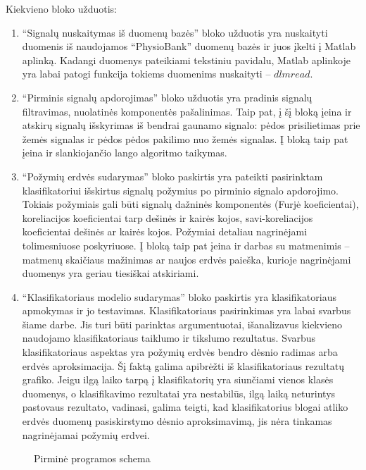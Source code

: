 \documentclass[]{vgtuef}
\begin{document}
Kiekvieno bloko užduotis:

\begin{enumerate}
\item ``Signalų nuskaitymas iš duomenų bazės'' bloko užduotis yra nuskaityti duomenis iš naudojamos ``PhysioBank'' duomenų bazės ir juos įkelti į Matlab aplinką. Kadangi duomenys pateikiami tekstiniu pavidalu, Matlab aplinkoje yra labai patogi funkcija tokiems duomenims nuskaityti -- $dlmread$.

\item ``Pirminis signalų apdorojimas'' bloko užduotis yra pradinis signalų filtravimas, nuolatinės komponentės pašalinimas. Taip pat, į šį bloką įeina ir atskirų signalų išskyrimas iš bendrai gaunamo signalo: pėdos prisilietimas prie žemės signalas ir pėdos pėdos pakilimo nuo žemės signalas. Į bloką taip pat įeina ir slankiojančio lango algoritmo taikymas.

\item ``Požymių erdvės sudarymas'' bloko paskirtis yra pateikti pasirinktam klasifikatoriui išskirtus signalų požymius po pirminio signalo apdorojimo. Tokiais požymiais gali būti signalų dažninės komponentės (Furjė koeficientai), koreliacijos koeficientai tarp dešinės ir kairės kojos, savi-koreliacijos koeficientai dešinės ar kairės kojos. Požymiai detaliau nagrinėjami tolimesniuose poskyriuose. Į bloką taip pat įeina ir darbas su matmenimis -- matmenų skaičiaus mažinimas ar naujos erdvės paieška, kurioje nagrinėjami duomenys yra geriau tiesiškai atskiriami.

\item ``Klasifikatoriaus modelio sudarymas'' bloko paskirtis yra klasifikatoriaus apmokymas ir jo testavimas. Klasifikatoriaus pasirinkimas yra labai svarbus šiame darbe. Jis turi būti parinktas argumentuotai, išanalizavus kiekvieno naudojamo klasifikatoriaus taiklumo ir tikslumo rezultatus. Svarbus klasifikatoriaus aspektas yra požymių erdvės bendro dėsnio radimas arba erdvės aproksimacija. Šį faktą galima apibrėžti iš klasifikatoriaus rezultatų grafiko. Jeigu ilgą laiko tarpą į klasifikatorių yra siunčiami vienos klasės duomenys, o klasifikavimo rezultatai yra nestabilūs, ilgą laiką neturintys pastovaus rezultato, vadinasi, galima teigti, kad klasifikatorius blogai atliko erdvės duomenų pasiskirstymo dėsnio aproksimavimą, jis nėra tinkamas nagrinėjamai požymių erdvei.
\end{enumerate}

\begin{figure}
  \centering
	
  \caption{Pirminė programos schema}
  \label{fig:pirmine_programos_schema}
\end{figure}
\end{document}
